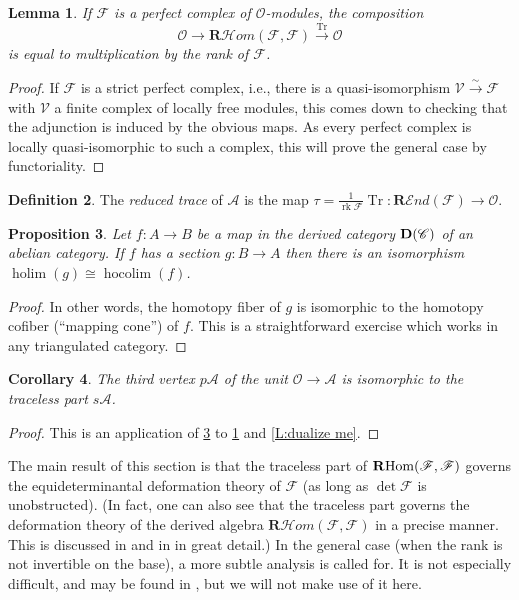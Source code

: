 \documentclass[11pt]{amsart}
\newcommand{\ms}[1]{\mathscr #1}
\newcommand{\simto}{\stackrel{\sim}{\to}}
\newcommand{\shom}{\ms H\!om}
\newcommand{\rshom}{\mathbf{R}\shom}
\DeclareMathOperator{\rhom}{\operatorname{{\bf R}Hom}}
\newcommand{\rsend}{\mathbf{R}\ms E\!nd}
\DeclareMathOperator{\D}{\operatorname{\bf D}}
\renewcommand{\[}{[\!\hspace{0.03em}[}
\renewcommand{\]}{]\!\hspace{0.03em}]}
\renewcommand{\(}{(\!\hspace{0.03em}(}
\renewcommand{\)}{)\!\hspace{0.03em})}
\DeclareMathOperator{\Tr}{\operatorname{Tr}}
\DeclareMathOperator{\rk}{\operatorname{rk}}
\newcommand{\xto}{\xrightarrow}
\newtheorem{lem}{Lemma}[subsubsection]%
\newtheorem{prop}[lem]{Proposition}
\newtheorem{cor}[lem]{Corollary}
\theoremstyle{definition}
\newtheorem{defn}[lem]{Definition}
\theoremstyle{remark}
\begin{document}
\begin{lem}\label{L:trace splitting} If $\ms F$ is a perfect complex of 
${\ms O}$-modules, the composition $${\ms O}\to\rshom(\ms F,\ms 
F)\xto{\operatorname{Tr}}{\ms O}$$ is 
equal to multiplication by the rank of $\ms F$.
\end{lem}
\begin{proof} If $\ms F$ is a strict perfect complex, i.e., there is a 
quasi-isomorphism $\ms V\simto\ms F$ with $\ms V$ a finite complex of 
locally free modules, this comes down 
to checking that the adjunction is induced by the obvious maps.  As 
every perfect complex is locally quasi-isomorphic to such a complex, 
this will prove the general case by functoriality.
\end{proof}

\begin{defn} The \emph{reduced trace\/} of $\ms A$ is the map 
$\tau=\frac{1}{\rk\ms F}\Tr:\rsend(\ms F)\to{\ms O}$.
\end{defn}

\begin{prop}\label{P:split me} Let $f:A\to B$ be a map in the derived category $\D(\ms C)$ 
of an abelian category.  If $f$ has a section $g:B\to A$ then there is 
an isomorphism $\operatorname{holim}(g)\cong\operatorname{hocolim}(f)$.
\end{prop}
\begin{proof} In other words, the homotopy fiber of $g$ is isomorphic 
to the homotopy cofiber (``mapping cone'') of $f$.  This is a straightforward exercise which works in any 
triangulated category.
\end{proof}

\begin{cor}\label{C:duality of p and s} The third vertex $p\ms A$ of the unit ${\ms O}\to\ms A$ is isomorphic 
to the traceless part $s\ms A$.
\end{cor}
\begin{proof} This is an application of \ref{P:split me} to 
\ref{L:trace splitting} and \ref{L:dualize me}.
\end{proof}

The main result of this section is that the traceless part of $\rhom(\ms 
F,\ms F)$ governs the equideterminantal deformation theory of $\ms F$ 
(as long as $\det\ms F$ is unobstructed).  
(In fact, one can also see that the traceless part governs the 
deformation theory of the derived algebra $\rshom(\ms F,\ms F)$ in a 
precise manner.  This is discussed in \cite{pgl-bundles} and in 
\cite{mythesis} in great detail.)  
In the general case (when the rank is not invertible on the base), a more 
subtle analysis is called for.  It is not especially difficult, and 
may be found in \cite[\S8.4]{artin-dejong}, but we will not make use of it here.
\end{document}
